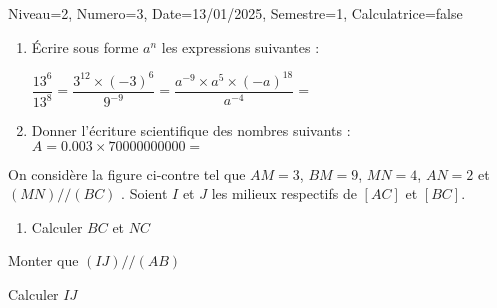 \documentclass[a4paper,12pt]{article}
\begin{document}
\begin{Maquette}[DS]{Niveau=2, Numero=3, Date=13/01/2025, Semestre=1, Calculatrice=false}

\begin{exercice}
\begin{enumerate}
\item{} Écrire sous forme $a^{n}$ les expressions suivantes :
\begin{tasks}
\task $\dfrac{13^{6}}{13^{8}}=$\anserline[1]
\task $\dfrac{3^{12}\times (-3)^{6}}{9^{-9}}=$\anserline[1]
\task $\dfrac{a^{-9}\times a^{5}\times (-a)^{18}}{a^{-4}}=$\anserline[1]
\end{tasks}
\item{} Donner l'écriture scientifique des nombres suivants :\newline
$A=0.003\times 70000000000 = $\anserline[1]
\end{enumerate}
\end{exercice}

\begin{exercice}
\begin{minipage}{0.7\linewidth}
On considère la figure ci-contre tel que $AM=3$, $BM=9$, $MN=4$, $AN=2$ et $(MN)//(BC)$ . Soient $I$ et $J$ les milieux respectifs de $[AC]$ et $[BC]$. 
\begin{enumerate}
\item{} Calculer $BC$ et $NC$\newline
\anserline[5]
\end{enumerate}
\end{minipage}%
\begin{minipage}{0.3\linewidth}
\end{minipage}\vspace{4mm}

\begin{enumerate}[start=2]
\begin{minipage}{0.48\linewidth}
\item{} Monter que $(IJ)//(AB)$\newline
\anserline[7]
\end{minipage}\hfill\vrule\hfill%
\begin{minipage}{.48\linewidth}
\item Calculer $IJ$\newline
\anserline[7]
\end{minipage}
\end{enumerate}
\end{exercice}


\end{Maquette}
\end{document}
